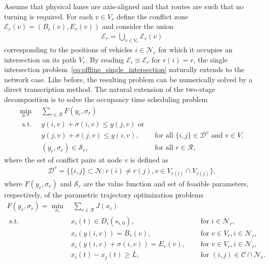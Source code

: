 \documentclass[a4paper]{article}
\theoremstyle{definition}
\theoremstyle{plain}
\begin{document}
Assume that physical lanes are axis-aligned and that routes are such that no
turning is required. For each $v \in V_{r}$ define the conflict zone
$\mathcal{E}_{r}(v) = (B_{r}(v), E_{r}(v))$ and consider the union
\begin{align}
  \mathcal{E}_{r} = \bigcup_{v \in V_{r}} \mathcal{E}_{r}(v)
\end{align}
corresponding to the positions of vehicles $i \in \mathcal{N}_{r}$ for which it
occupies an intersection on its path $V_{r}$.
%
By reading $\mathcal{E}_{i} \equiv \mathcal{E}_{r}$ for $r(i) = r$, the single
intersection problem~\eqref{eq:offline_single_intersection} naturally extends to
the network case. Like before, the resulting problem can be numerically solved
by a direct transcription method.
%
The natural extension of the two-stage decomposition is to solve the occupancy time scheduling problem
\begin{subequations}
\begin{align}
  \min_{y,\sigma} \;\; & \sum_{r \in \mathcal{R}} F(y_{r}, \sigma_{r}) \\
  \text{ s.t. } & y(i,v) + \sigma(i,v) \leq y(j,v) \text{ or }  \\
                & y(j,v) + \sigma(j,v) \leq y(i,v) , & \text{ for all } \{i,j\} \in \mathcal{D}^{v} \text{ and } v \in V, \\
  & (y_{r}, \sigma_{r}) \in \mathcal{S}_{r} , \quad & \text{ for all } r \in \mathcal{R} ,
\end{align}
\end{subequations}
where the set of conflict pairs at node $v$ is defined as
\begin{align}
\mathcal{D}^{v} = \{ \{i,j\} \subset \mathcal{N} : r(i) \neq r(j), v \in V_{r(i)} \cap V_{r(j)} \} ,
\end{align}
%
where $F(y_{r}, \sigma_{r})$ and $\mathcal{S}_{r}$ are the value function and
set of feasible parameters, respectively, of the parametric trajectory
optimization problems
%
\begin{subequations}
\begin{align}
  F(y_{r}, \sigma_{r}) = \min_{x_{r}} & \; \sum_{r \in \mathcal{R}} J(x_{i}) \\
  \text{ s.t. } & x_{i}(t) \in D_{i}(s_{i,0}) , \quad & \text{ for } i \in \mathcal{N}_{r} , \\
  & x_{i}(y(i,v)) = B_{r}(v) , \quad & \text{ for } v \in V_{r} , i \in \mathcal{N}_{r} , \\
  & x_{i}(y(i,v) + \sigma(i,v)) = E_{r}(v) , \quad & \text{ for } v \in V_{r} , i \in \mathcal{N}_{r} , \\
  & x_{i}(t) - x_{j}(t) \geq L , \quad & \text{ for } (i, j) \in \mathcal{C} \cap \mathcal{N}_{r} .
\end{align}
\end{subequations}
\end{document}
